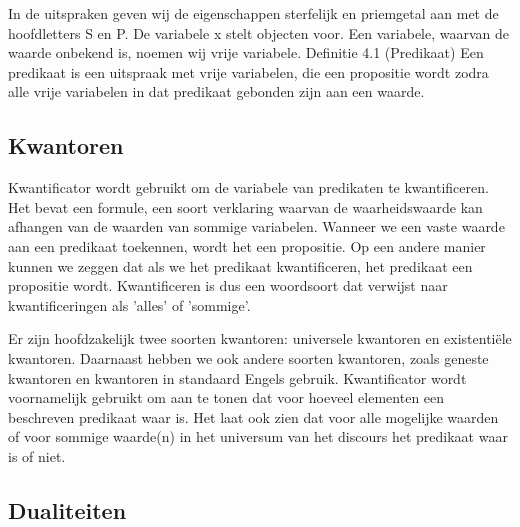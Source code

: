 \documentclass{article}
\begin{document}
	
	
	In de uitspraken geven wij de eigenschappen sterfelijk en priemgetal aan met de hoofdletters
	S en P. De variabele x stelt objecten voor. Een variabele, waarvan de waarde onbekend
	is, noemen wij vrije variabele.
	Definitie 4.1 (Predikaat) Een predikaat is een uitspraak met vrije variabelen, die een
	propositie wordt zodra alle vrije variabelen in dat predikaat gebonden zijn aan een waarde.
	
	\subsection{Kwantoren}
	
	Kwantificator wordt gebruikt om de variabele van predikaten te kwantificeren. Het bevat een formule, een soort verklaring waarvan de waarheidswaarde kan afhangen van de waarden van sommige variabelen. Wanneer we een vaste waarde aan een predikaat toekennen, wordt het een propositie. Op een andere manier kunnen we zeggen dat als we het predikaat kwantificeren, het predikaat een propositie wordt. Kwantificeren is dus een woordsoort dat verwijst naar kwantificeringen als 'alles' of 'sommige'.
	
	Er zijn hoofdzakelijk twee soorten kwantoren: universele kwantoren en existentiële kwantoren. Daarnaast hebben we ook andere soorten kwantoren, zoals geneste kwantoren en kwantoren in standaard Engels gebruik. Kwantificator wordt voornamelijk gebruikt om aan te tonen dat voor hoeveel elementen een beschreven predikaat waar is. Het laat ook zien dat voor alle mogelijke waarden of voor sommige waarde(n) in het universum van het discours het predikaat waar is of niet.
	
	
	\subsection{Dualiteiten}
	
\end{document}
